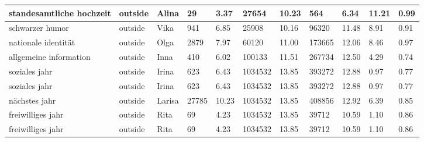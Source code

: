 \begin{longtable}{|p{3cm}|p{1cm}|p{1cm}|R{0.8cm}|R{0.8cm}|R{1.2cm}|R{1cm}|R{1.3cm}|R{1cm}|R{0.8cm}|R{0.6cm}|}
standesamtliche hochzeit                                           & outside     & Alina     & 29                  & 3.37                      & 27654      & 10.23            & 564          & 6.34                  & 11.21 & 0.99                 \\ \hline
schwarzer humor                                                    & outside     & Vika      & 941                 & 6.85                      & 25908      & 10.16            & 96320        & 11.48                 & 8.91  & 0.91                 \\ \hline
nationale identit\"{a}t                                            & outside     & Olga      & 2879                & 7.97                      & 60120      & 11.00            & 173665       & 12.06                 & 8.46  & 0.97                 \\ \hline
allgemeine information                                             & outside     & Inna      & 410                 & 6.02                      & 100133     & 11.51            & 267734       & 12.50                 & 4.29  & 0.74                 \\ \hline
soziales jahr                                                      & outside     & Irina     & 623                 & 6.43                      & 1034532    & 13.85            & 393272       & 12.88                 & 0.97  & 0.77                 \\ \hline
soziales jahr                                         & outside     & Irina     & 623                 & 6.43                      & 1034532    & 13.85            & 393272       & 12.88                 & 0.97  & 0.77                 \\ \hline
n\"{a}chstes jahr                                                  & outside     & Larisa    & 27785               & 10.23                     & 1034532    & 13.85            & 408856       & 12.92                 & 6.39  & 0.85                 \\ \hline
freiwilliges jahr                                                  & outside     & Rita      & 69                  & 4.23                      & 1034532    & 13.85            & 39712        & 10.59                 & 1.10  & 0.86                 \\ \hline
freiwilliges jahr                                                  & outside     & Rita      & 69                  & 4.23                      & 1034532    & 13.85            & 39712        & 10.59                 & 1.10  & 0.86                 \\ \hline

\end{longtable}
